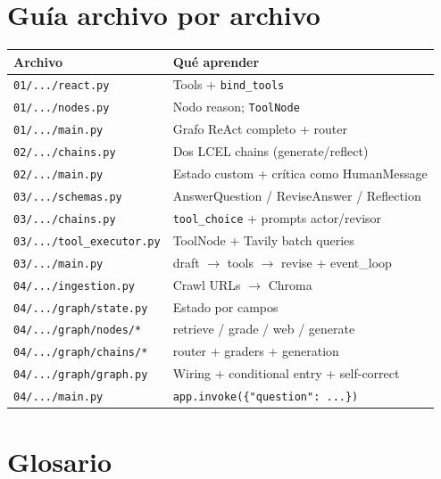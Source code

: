 \documentclass[11pt,a4paper]{article}
\begin{document}
\section{Guía archivo por archivo}

\begin{longtable}{@{}p{5.6cm}p{9.6cm}@{}}
\toprule
\textbf{Archivo} & \textbf{Qué aprender} \\
\midrule
\endhead
\texttt{01/.../react.py} & Tools + \texttt{bind\_tools} \\
\texttt{01/.../nodes.py} & Nodo reason; \texttt{ToolNode} \\
\texttt{01/.../main.py} & Grafo ReAct completo + router \\
\texttt{02/.../chains.py} & Dos LCEL chains (generate/reflect) \\
\texttt{02/.../main.py} & Estado custom + crítica como HumanMessage \\
\texttt{03/.../schemas.py} & AnswerQuestion / ReviseAnswer / Reflection \\
\texttt{03/.../chains.py} & \texttt{tool\_choice} + prompts actor/revisor \\
\texttt{03/.../tool\_executor.py} & ToolNode + Tavily batch queries \\
\texttt{03/.../main.py} & draft $\to$ tools $\to$ revise + event\_loop \\
\texttt{04/.../ingestion.py} & Crawl URLs $\to$ Chroma \\
\texttt{04/.../graph/state.py} & Estado por campos \\
\texttt{04/.../graph/nodes/*} & retrieve / grade / web / generate \\
\texttt{04/.../graph/chains/*} & router + graders + generation \\
\texttt{04/.../graph/graph.py} & Wiring + conditional entry + self-correct \\
\texttt{04/.../main.py} & \texttt{app.invoke(\{"question": ...\})} \\
\bottomrule
\end{longtable}

\section{Glosario}
\end{document}
